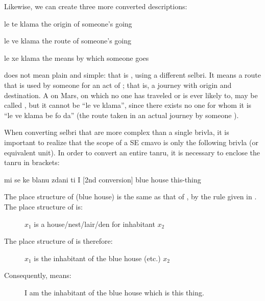 Likewise, we can create three more converted
    descriptions:
\begin{example}
le te klama\n
the origin of someone's going
\end{example}

\begin{example}
le ve klama\n
the route of someone's going
\end{example}

\begin{example}
le xe klama\n
the means by which someone goes
\end{example}

 does not mean 
    plain and simple: that is , using a different
    selbri. It means a route that is used by someone for an act of
    ; that is, a journey with origin and destination. A
     on Mars, on which no one has traveled or is ever
    likely to, may be called , but it cannot be ``le ve
    klama'', since there exists no one for whom it is ``le ve klama
    be fo da'' (the route taken in an actual journey by someone
    ). 

When converting selbri that are more complex than a single
    brivla, it is important to realize that the scope of a SE cmavo
    is only the following brivla (or equivalent unit). In order to
    convert an entire tanru, it is necessary to enclose the tanru
    in  brackets:
\begin{example}
mi se ke blanu zdani  ti\n
I [2nd conversion] blue house this-thing
\end{example}

The place structure of  (blue house) is the
    same as that of , by the rule given in . The place structure of 
    is:
\begin{description}
\item[] $x_1$ is a house/nest/lair/den for inhabitant $x_2$

\end{description}

The place structure of  is
    therefore:
\begin{description}
\item[] $x_1$ is the inhabitant of the blue house (etc.) $x_2$

\end{description}

Consequently,  means:
\begin{description}
\item[] I am the inhabitant of the blue house which is this thing.

\end{description}

